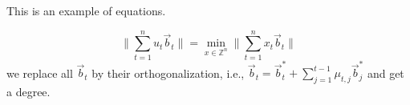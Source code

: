 This is an example of equations.

\begin{equation*}
\| {\sum_{t=1}^{n} u_t \vec{b}_t} \| = \min_{x\in \mathbb{Z}^{n}}  \| \sum_{t=1}^{n} x_t \vec{b}_t \|
\end{equation*}
we replace all $\vec{b}_{t}$ by their orthogonalization, i.e., $\vec{b}_{t} = \vec{b}_{t}^{*} + \sum_{j=1}^{t-1} \mu_{t,j} \vec{b}_{j}^{*}$ and get a degree.










